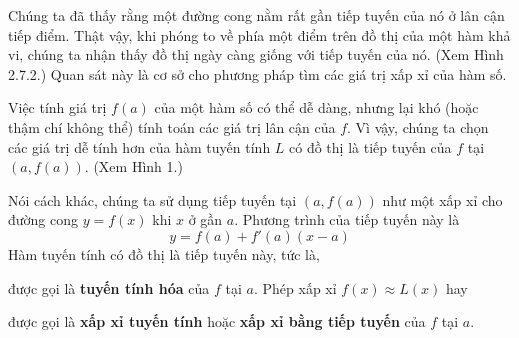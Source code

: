 \begin{minipage}[t]{125mm}
  \fontsize{9.5pt}{12.5pt}\selectfont
  Chúng ta đã thấy rằng một đường cong nằm rất gần tiếp tuyến của nó ở lân cận tiếp điểm. Thật vậy, khi phóng to về phía một điểm trên đồ thị của một hàm khả vi, chúng ta nhận thấy đồ thị ngày càng giống với tiếp tuyến của nó. (Xem Hình 2.7.2.) Quan sát này là cơ sở cho phương pháp tìm các giá trị xấp xỉ của hàm số.\par\vspace{8pt}
  
  \noindent{\color{stewartblue}\rule{1.1ex}{1.1ex}}\hspace{0.5em}{\bfseries Tuyến tính hóa và xấp xỉ}\par\vspace{4pt}
  
  Việc tính giá trị $f(a)$ của một hàm số có thể dễ dàng, nhưng lại khó (hoặc thậm chí không thể) tính toán các giá trị lân cận của $f$. Vì vậy, chúng ta chọn các giá trị dễ tính hơn của hàm tuyến tính $L$ có đồ thị là tiếp tuyến của $f$ tại $(a, f(a))$. (Xem Hình 1.)\par\vspace{6pt}
  
  Nói cách khác, chúng ta sử dụng tiếp tuyến tại $(a, f(a))$ như một xấp xỉ cho đường cong $y = f(x)$ khi $x$ ở gần $a$. Phương trình của tiếp tuyến này là
  \[
  y = f(a) + f'(a)(x - a)
  \]
  Hàm tuyến tính có đồ thị là tiếp tuyến này, tức là,
  \par\vspace{4pt}
  \begin{center}
  \end{center}
  \vspace{2pt}
  được gọi là \textbf{tuyến tính hóa} của $f$ tại $a$. Phép xấp xỉ $f(x) \approx L(x)$ hay
  \par\vspace{4pt}
  \begin{center}
  \end{center}
  \vspace{2pt}
  được gọi là \textbf{xấp xỉ tuyến tính} hoặc \textbf{xấp xỉ bằng tiếp tuyến} của $f$ tại $a$.\par\vspace{8pt}
  

\end{minipage}
